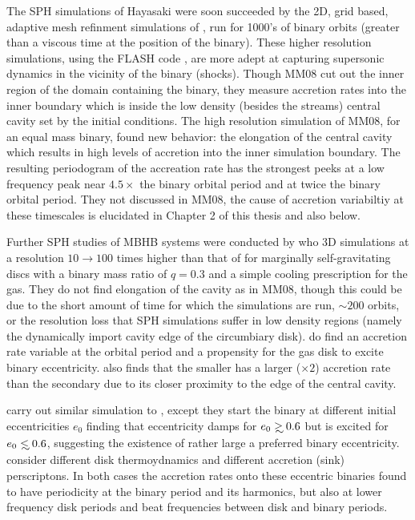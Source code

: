 The SPH simulations of Hayasaki were soon succeeded by the 2D, grid based,
adaptive mesh refinment simulations of \citep[][hereafter MM08]{MacFadyen:2008},
 run for 1000's of binary orbits (greater than a viscous
time at the position of the binary). These higher resolution simulations,
using the FLASH code \citep{Fryxell:2000}, are more adept at capturing
supersonic dynamics in the vicinity of the binary (shocks). Though
MM08 cut out the inner region of the domain containing the
binary, they measure accretion rates into the inner boundary which is inside
the low density (besides the streams) central cavity set by the initial
conditions. The high resolution simulation of MM08, for an
equal mass binary, found new behavior: the elongation of the central cavity
which results in high levels of accretion into the inner simulation boundary.
The resulting periodogram of the accreation rate  has the strongest peeks at a
low frequency peak near $4.5 \times$ the binary orbital period and at twice
the binary orbital period. They not discussed in MM08, the cause of accretion
variabiltiy at these timescales is elucidated in Chapter 2 of this thesis and
also \citep{ShiKrolik:2012} below.


Further SPH studies of MBHB systems were conducted by \citep{Cuadra:2009} who
3D simulations at a resolution $10 \rightarrow 100$ times higher than that of
\cite{Haysaki:2007} for marginally self-gravitating discs with a binary mass
ratio of $q=0.3$ and a simple cooling prescription for the gas. They do not
find elongation of the cavity as in MM08, though this could be due to the
short amount of time for which the simulations are run, $\sim 200$ orbits, or
the resolution loss that SPH simulations suffer in low density regions (namely
the dynamically import cavity edge of the circumbiary disk).
\citep{Cuadra:2009} do find an accretion rate variable at the orbital period
and a propensity for the gas disk to excite binary eccentricity.
\citep{Cuadra:2009} also finds that the smaller has a larger ($\times 2$)
accretion rate than the secondary due to its closer proximity to the edge of
the central cavity.


\citep{Roedig:2011:trqs} carry out similar simulation to \citep{Cuadra:2009}, except they start the binary at different initial eccentricities $e_0$ finding that eccentricity damps for $e_0 \gsim 0.6$ but is excited for $e_0 \lsim 0.6$, suggesting the existence of rather large a preferred binary eccentricity. \citep{Roedig2012:eccevo} consider different disk thermoydnamics and different accretion (sink) perscriptons. In both cases the accretion rates onto these eccentric binaries  found to have periodicity at the binary period and its harmonics, but also at lower frequency disk periods and beat frequencies between disk and binary periods.


